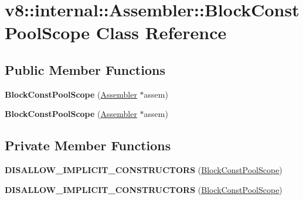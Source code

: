 \hypertarget{classv8_1_1internal_1_1_assembler_1_1_block_const_pool_scope}{}\section{v8\+:\+:internal\+:\+:Assembler\+:\+:Block\+Const\+Pool\+Scope Class Reference}
\label{classv8_1_1internal_1_1_assembler_1_1_block_const_pool_scope}
\subsection*{Public Member Functions}
\begin{DoxyCompactItemize}
\item 
{\bfseries Block\+Const\+Pool\+Scope} (\hyperlink{classv8_1_1internal_1_1_assembler}{Assembler} $\ast$assem)\hypertarget{classv8_1_1internal_1_1_assembler_1_1_block_const_pool_scope_ac38a15fd24b4a70820c1fc63a9eb0640}{}\label{classv8_1_1internal_1_1_assembler_1_1_block_const_pool_scope_ac38a15fd24b4a70820c1fc63a9eb0640}

\item 
{\bfseries Block\+Const\+Pool\+Scope} (\hyperlink{classv8_1_1internal_1_1_assembler}{Assembler} $\ast$assem)\hypertarget{classv8_1_1internal_1_1_assembler_1_1_block_const_pool_scope_ac38a15fd24b4a70820c1fc63a9eb0640}{}\label{classv8_1_1internal_1_1_assembler_1_1_block_const_pool_scope_ac38a15fd24b4a70820c1fc63a9eb0640}

\end{DoxyCompactItemize}
\subsection*{Private Member Functions}
\begin{DoxyCompactItemize}
\item 
{\bfseries D\+I\+S\+A\+L\+L\+O\+W\+\_\+\+I\+M\+P\+L\+I\+C\+I\+T\+\_\+\+C\+O\+N\+S\+T\+R\+U\+C\+T\+O\+RS} (\hyperlink{classv8_1_1internal_1_1_assembler_1_1_block_const_pool_scope}{Block\+Const\+Pool\+Scope})\hypertarget{classv8_1_1internal_1_1_assembler_1_1_block_const_pool_scope_a98c8c9cc29d26f7dbb14fe1de1c2aff2}{}\label{classv8_1_1internal_1_1_assembler_1_1_block_const_pool_scope_a98c8c9cc29d26f7dbb14fe1de1c2aff2}

\item 
{\bfseries D\+I\+S\+A\+L\+L\+O\+W\+\_\+\+I\+M\+P\+L\+I\+C\+I\+T\+\_\+\+C\+O\+N\+S\+T\+R\+U\+C\+T\+O\+RS} (\hyperlink{classv8_1_1internal_1_1_assembler_1_1_block_const_pool_scope}{Block\+Const\+Pool\+Scope})\hypertarget{classv8_1_1internal_1_1_assembler_1_1_block_const_pool_scope_a98c8c9cc29d26f7dbb14fe1de1c2aff2}{}\label{classv8_1_1internal_1_1_assembler_1_1_block_const_pool_scope_a98c8c9cc29d26f7dbb14fe1de1c2aff2}

\end{DoxyCompactItemize}
